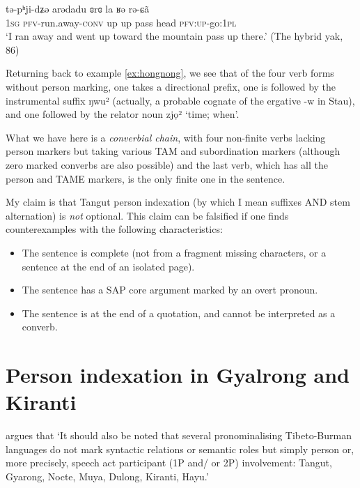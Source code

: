 \documentclass[oldfontcommands,oneside,a4paper,11pt]{article}
\newcommand{\ipa}[1]{{\phon \mbox{#1}}} %
\begin{document}
\begin{exe}
\ex \label{tEphjidZE}
\gll \ipa{ŋa} 	\ipa{tə-pʰji-dʑə} 	\ipa{arədadu} 	\ipa{ɞrɞ} 	\ipa{la} 	\ipa{ʁə} 	\ipa{rə-ɕã} \\
 \textsc{1sg} \textsc{pfv}-run.away-\textsc{conv} up up pass head \textsc{pfv:up}-go:\textsc{1pl} \\
\glt `I ran away and went up toward the mountain pass up there.' (The hybrid yak, 86) 
\end{exe}

Returning back to example \ref{ex:hongnong}, we see that of the four verb forms without person marking, one takes a directional prefix, one is followed by the instrumental suffix  \ipa{ŋwu²} (actually, a probable cognate of the ergative \ipa{-w} in Stau), and one followed by the relator noun  \ipa{zjọ²} `time; when'. 

What we have here is a \textit{converbial chain}, with four non-finite verbs lacking person markers but taking various TAM and subordination markers (although zero marked converbs are also possible) and the last verb, which has all the person and TAME markers, is the only finite one in the sentence.

My claim is that Tangut person indexation (by which I mean suffixes AND stem alternation) is \textit{not} optional. This claim can be falsified if one finds counterexamples with the following characteristics:

\begin{itemize}
\item The sentence is complete (not from a fragment missing characters, or a sentence at the end of an isolated page).
\item The sentence has a SAP core argument marked by an overt pronoun.
\item The sentence is at the end of a quotation, and cannot be interpreted as a converb.
\end{itemize}

\section{Person indexation in Gyalrong and Kiranti} \label{sec:rgyalrong}
\citet[53]{zeisler15eat} argues  that `It should also be noted that several pronominalising Tibeto-Burman languages do not mark syntactic relations or semantic roles but simply person or, more precisely, speech act participant (1P and/ or 2P) involvement: Tangut, Gyarong, Nocte, Muya, Dulong, Kiranti, Hayu.' 
\end{document}
